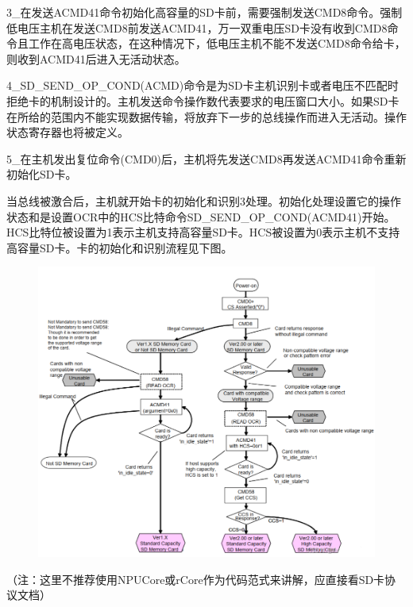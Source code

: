3_在发送ACMD41命令初始化高容量的SD卡前，需要强制发送CMD8命令。强制低电压主机在发送CMD8前发送ACMD41，万一双重电压SD卡没有收到CMD8命令且工作在高电压状态，在这种情况下，低电压主机不能不发送CMD8命令给卡，则收到ACMD41后进入无活动状态。

4_SD_SEND_OP_COND(ACMD)命令是为SD卡主机识别卡或者电压不匹配时拒绝卡的机制设计的。主机发送命令操作数代表要求的电压窗口大小。如果SD卡在所给的范围内不能实现数据传输，将放弃下一步的总线操作而进入无活动。操作状态寄存器也将被定义。

5_在主机发出复位命令(CMD0)后，主机将先发送CMD8再发送ACMD41命令重新初始化SD卡。

当总线被激合后，主机就开始卡的初始化和识别3处理。初始化处理设置它的操作状态和是设置OCR中的HCS比特命令SD_SEND_OP_COND(ACMD41)开始。HCS比特位被设置为1表示主机支持高容量SD卡。HCS被设置为0表示主机不支持高容量SD卡。卡的初始化和识别流程见下图。
\begin{figure}[H]
    \centering
    \includegraphics{figures/06-02-初始化.png}
\end{figure}
（注：这里不推荐使用NPUCore或rCore作为代码范式来讲解，应直接看SD卡协议文档）

